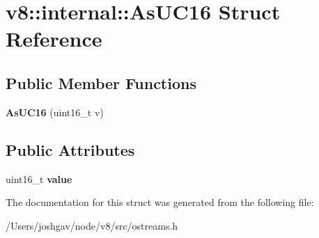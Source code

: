 \hypertarget{structv8_1_1internal_1_1_as_u_c16}{}\section{v8\+:\+:internal\+:\+:As\+U\+C16 Struct Reference}
\label{structv8_1_1internal_1_1_as_u_c16}
\subsection*{Public Member Functions}
\begin{DoxyCompactItemize}
\item 
{\bfseries As\+U\+C16} (uint16\+\_\+t v)\hypertarget{structv8_1_1internal_1_1_as_u_c16_a3e5320cfba0c7a9db5b53ea51badb725}{}\label{structv8_1_1internal_1_1_as_u_c16_a3e5320cfba0c7a9db5b53ea51badb725}

\end{DoxyCompactItemize}
\subsection*{Public Attributes}
\begin{DoxyCompactItemize}
\item 
uint16\+\_\+t {\bfseries value}\hypertarget{structv8_1_1internal_1_1_as_u_c16_a47b40c52eca0f02200a80f480afe07d5}{}\label{structv8_1_1internal_1_1_as_u_c16_a47b40c52eca0f02200a80f480afe07d5}

\end{DoxyCompactItemize}


The documentation for this struct was generated from the following file\+:\begin{DoxyCompactItemize}
\item 
/\+Users/joshgav/node/v8/src/ostreams.\+h\end{DoxyCompactItemize}
